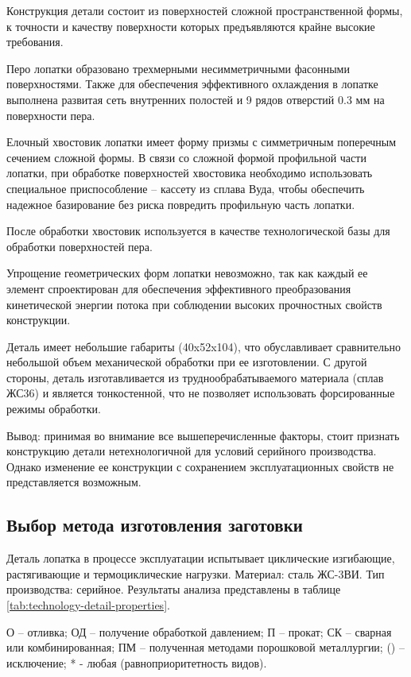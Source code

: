 Конструкция детали состоит из поверхностей сложной пространственной формы, к точности и качеству поверхности которых предъявляются крайне высокие требования.

Перо лопатки образовано трехмерными несимметричными фасонными поверхностями. Также для обеспечения эффективного охлаждения в лопатке выполнена развитая сеть внутренних полостей и 9 рядов отверстий 0.3 мм на поверхности пера.

Елочный хвостовик лопатки имеет форму призмы с симметричным поперечным сечением сложной формы. В связи со сложной формой профильной части лопатки, при обработке поверхностей хвостовика необходимо использовать специальное приспособление – кассету из сплава Вуда, чтобы обеспечить надежное базирование без риска повредить профильную часть лопатки.

После обработки хвостовик используется в качестве технологической базы для обработки поверхностей пера.

Упрощение геометрических форм лопатки невозможно, так как каждый ее элемент спроектирован для обеспечения эффективного преобразования кинетической энергии потока при соблюдении высоких прочностных свойств конструкции.

Деталь имеет небольшие габариты (40x52x104), что обуславливает сравнительно небольшой объем механической обработки при ее изготовлении. С другой стороны, деталь изготавливается из труднообрабатываемого материала (сплав ЖС36) и является тонкостенной, что не позволяет использовать форсированные режимы обработки.

Вывод: принимая во внимание все вышеперечисленные факторы, стоит признать конструкцию детали нетехнологичной для условий серийного производства. Однако изменение ее конструкции с сохранением эксплуатационных свойств не представляется возможным.

\subsection{Выбор метода изготовления заготовки}
Деталь лопатка в процессе эксплуатации испытывает циклические изгибающие, растягивающие и термоциклические нагрузки. Материал: сталь ЖС-3ВИ. Тип производства: серийное.
Результаты анализа представлены в таблице \ref{tab:technology-detail-properties}.

О – отливка; ОД – получение обработкой давлением; П – прокат; СК – сварная или комбинированная; ПМ – полученная методами порошковой металлургии; () – исключение; * - любая (равноприоритетность видов).

